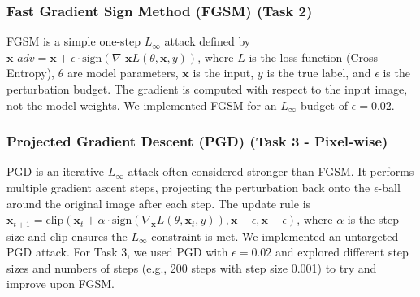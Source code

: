 \documentclass[letterpaper]{article}
\begin{document}
\subsubsection{Fast Gradient Sign Method (FGSM) (Task 2)}
FGSM is a simple one-step $L_\infty$ attack defined by $\mathbf{x}\_{adv} = \mathbf{x} + \epsilon \cdot \text{sign}(\nabla\_{\mathbf{x}} L(\theta, \mathbf{x}, y))$, where $L$ is the loss function (Cross-Entropy), $\theta$ are model parameters, $\mathbf{x}$ is the input, $y$ is the true label, and $\epsilon$ is the perturbation budget. The gradient is computed with respect to the input image, not the model weights. We implemented FGSM for an $L_\infty$ budget of $\epsilon = 0.02$.

\subsubsection{Projected Gradient Descent (PGD) (Task 3 - Pixel-wise)}
PGD is an iterative $L_\infty$ attack often considered stronger than FGSM. It performs multiple gradient ascent steps, projecting the perturbation back onto the $\epsilon$-ball around the original image after each step. The update rule is $\mathbf{x}_{t+1} = \text{clip}(\mathbf{x}_t + \alpha \cdot \text{sign}(\nabla_{\mathbf{x}} L(\theta, \mathbf{x}_t, y)), \mathbf{x} - \epsilon, \mathbf{x} + \epsilon)$, where $\alpha$ is the step size and clip ensures the $L_\infty$ constraint is met. We implemented an untargeted PGD attack. For Task 3, we used PGD with $\epsilon=0.02$ and explored different step sizes and numbers of steps (e.g., 200 steps with step size 0.001) to try and improve upon FGSM.
\end{document}
